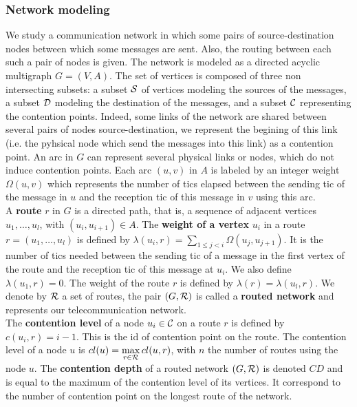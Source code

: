 \documentclass[english]{article}
\begin{document}
  \subsubsection{Network modeling}
  We study a communication network in which some pairs of source-destination nodes between which some messages are sent. Also, the routing between each such a pair of nodes is given.
The network is modeled as a directed acyclic multigraph $G=(V,A)$. The set of vertices is composed of three non intersecting subsets: a subset ${\cal S}$ of vertices modeling the sources of the messages, a subset ${\cal D}$ modeling the destination of the messages, and a subset ${\cal C}$ representing the contention points. Indeed, some links of the network are shared between several pairs of nodes source-destination, we represent the begining of this link (i.e. the pyhsical node which send the messages into this link) as a contention point. An arc in $G$ can represent several physical links or nodes, which do not induce contention points. Each arc  $(u,v)$ in $A$ is labeled by an integer weight $\Omega(u,v)$ which represents the number of tics elapsed between the sending tic of the message in $u$ and the reception tic of this message in $v$ using this arc. \\
  A {\bf route} $r$ in $G$ is a directed path, that is, a sequence of adjacent vertices $u_1, \ldots , u_{l}$, with $(u_i,u_{i+1}) \in A$.  The {\bf weight of a vertex} $u_i$ in a route $r=(u_1,\dots,u_l)$ is defined by $\lambda(u_i,r)= \sum\limits_{1 \leq j <i} \Omega(u_j, u_{j+1})$. It is the number of tics needed between the sending tic of a message in the first vertex of the route and the reception tic of this message at $u_i$. We also define $\lambda(u_1,r)=0$. The weight of the route $r$ is defined by $\lambda (r)= \lambda (u_l,r)$.
We denote by ${\cal R}$ a set of routes, the pair $(G,{\cal R})$ is called a {\bf routed network} and represents our telecommunication network.\\
The \textbf{contention level} of a node $u_i \in {\cal C}$ on a route $r$ is defined by $c(u_i,r) = i-1$. This is the id of contention point on the route. The contention level of a node $u$ is $cl(u) = \max\limits_{r\in{\cal R}} cl(u,r)$, with $n$ the number of routes using the node $u$.
The  \textbf{contention depth} of a routed network $(G,{\cal R})$ is denoted $CD$ and is equal to the maximum of the contention level of its vertices. It correspond to the number of contention point on the longest route of the network.
\end{document}
